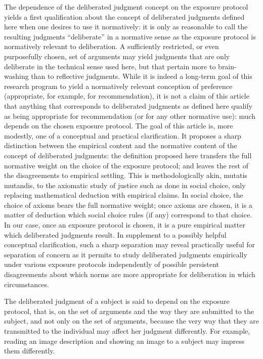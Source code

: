 \documentclass[version=last, pagesize, twoside=off, bibliography=totoc, DIV=calc, fontsize=12pt, a4paper, french, english]{scrartcl}
\begin{document}
The dependence of the deliberated judgment concept on the exposure protocol yields a first qualification about the concept of deliberated judgments defined here when one desires to use it normatively: it is only as reasonable to call the resulting judgments “deliberate” in a normative sense as the exposure protocol is normatively relevant to deliberation. A sufficiently restricted, or even purposefully chosen, set of arguments may yield judgments that are only deliberate in the technical sense used here, but that pertain more to brain-washing than to reflective judgments. While it is indeed a long-term goal of this research program to yield a normatively relevant conception of preference (appropriate, for example, for recommendation), it is not a claim of this article that anything that corresponds to deliberated judgments as defined here qualify as being appropriate for recommendation (or for any other normative use): much depends on the chosen exposure protocol. The goal of this article is, more modestly, one of a conceptual and practical clarification. It proposes a sharp distinction between the empirical content and the normative content of the concept of deliberated judgments: the definition proposed here transfers the full normative weight on the choice of the exposure protocol; and leaves the rest of the disagreements to empirical settling. This is methodologically akin, mutatis mutandis, to the axiomatic study of justice such as done in social choice, only replacing mathematical deduction with empirical claims. In social choice, the choice of axioms bears the full normative weight; once axioms are chosen, it is a matter of deduction which social choice rules (if any) correspond to that choice. In our case, once an exposure protocol is chosen, it is a pure empirical matter which deliberated judgments result.
In supplement to a possibly helpful conceptual clarification, such a sharp separation may reveal practically useful for separation of concern as it permits to study deliberated judgments empirically under various exposure protocols independently of possible persistent disagreements about which norms are more appropriate for deliberation in which circumstances.

The deliberated judgment of a subject is said to depend on the exposure protocol, that is, on the set of arguments and the way they are submitted to the subject, and not only on the set of arguments, because the very way that they are transmitted to the individual may affect her judgment differently. For example, reading an image description and showing an image to a subject may impress them differently.
\end{document}
